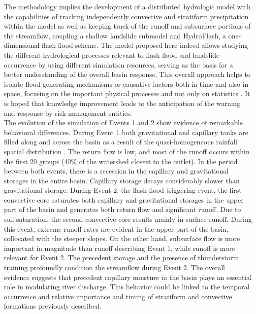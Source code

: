 \documentclass[hess, manuscript]{copernicus}
\begin{document}
The methodology implies the development of a distributed hydrologic model with the capabilities of tracking independently convective and stratiform precipitation within the model as well as keeping track of the runoff and subsurface portions of the streamflow,  coupling a shallow landslide submodel and HydroFlash, a one-dimensional flash flood scheme.  The model proposed here indeed allows studying the different hydrological processes relevant to flash flood and landslide occurrence by using different simulation resources, serving as the basis for a better understanding of the overall basin response. This overall approach helps to isolate flood generating mechanisms or causative factors both in time and also in space, focusing on the important physical processes and not only on statistics \citep{klemes1993, Merz2003}. It is hoped that knowledge improvement leads to the anticipation of the warning and response by risk management entities. \\

The evolution of the simulation of Events 1 and 2 show evidence of remarkable behavioral differences. During Event 1 both gravitational and capillary tanks are filled along and across the basin as a result of the quasi-homogeneous rainfall spatial distribution \citep{Zoccatelli2011}. The return flow is low, and most of the runoff occurs within the first 20 groups (40\% of the watershed closest to the outlet).   In the period between both events, there is a recession in the capillary and gravitational storages in the entire basin. Capillary storage decays considerably slower than gravitational storage.  During Event 2, the flash flood triggering event,  the first convective core saturates both capillary and gravitational storages in the upper part of the basin and generates both return flow and significant runoff.   Due to soil saturation, the second convective core results mainly in surface runoff. During this event, extreme runoff rates are evident in the upper part of the basin, collocated with the steeper slopes. On the other hand, subsurface flow is more important in magnitude than runoff describing Event 1, while runoff is more relevant for Event 2. The precedent storage and the presence of thunderstorm training profoundly condition the streamflow during Event 2. The overall evidence suggests that precedent capillary moisture in the basin plays an essential role in modulating river discharge. This behavior could be linked to the temporal occurrence and relative importance and timing of stratiform and convective formations previously described. \\
\end{document}
